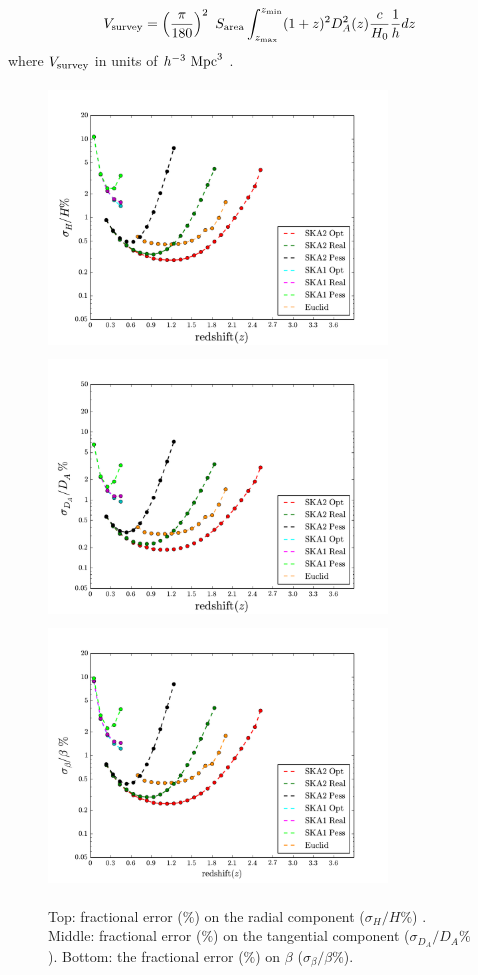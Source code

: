 \documentclass[useAMS,usenatbib]{mn2e}
\begin{document}
\begin{equation}\label{Vsurvey}
V_{\rm survey} = \left(\frac{\pi}{180}\right)^2  \ S_{\rm area}\int^{z_{\rm min}}_{z_{\rm max}} ( 1+z)^2 D_A^2(z) \frac{c }{H_0} \frac{1}{h}  dz
\end{equation}
where $V_{\rm survey}$ in units of $h^{-3} \ {\rm Mpc}^3$ \citep{Hogg:1999ad}.
\begin{center}
\begin{figure}
\includegraphics[height=7cm,width=9cm]{plots/output_lnH_mario_bias_corrected_nz.pdf}
\includegraphics[height=7cm,width=9cm]{plots/output_lnda_mario_bias_corrected_nz.pdf}
\includegraphics[height=7cm,width=9cm]{plots/output_Beta_mario_bias_corrected_nz.pdf}
\caption{Top: fractional error ($\%$)  on  the radial component ($\sigma_H/H \%$) . Middle:  fractional error ($\%$) on the tangential component  ($\sigma_{D_A}/D_A  \%$). Bottom: the fractional error ($\%$) on $\beta$ ($\sigma_\beta/\beta \%$).}
\label{fig:fraction}
\end{figure}
\end{center}
\end{document}
